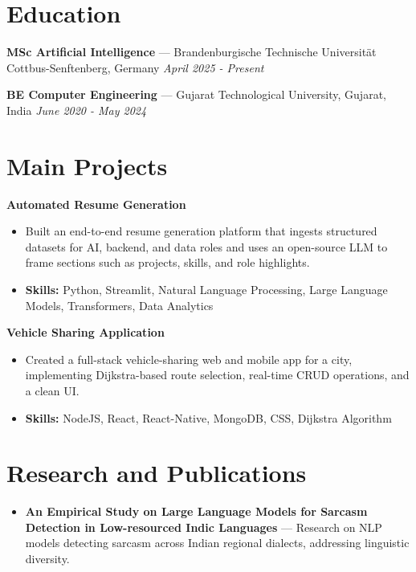 \documentclass[a4paper,10pt]{article}
\begin{document}
\section*{Education}
\textbf{MSc Artificial Intelligence} — Brandenburgische Technische Universität Cottbus-Senftenberg, Germany \hfill \textit{April 2025 - Present}\par
\vspace{1.5pt}
\textbf{BE Computer Engineering} — Gujarat Technological University, Gujarat, India \hfill \textit{June 2020 - May 2024}\par

\section*{Main Projects}
\textbf{Automated Resume Generation}\par
\vspace{1pt}
\begin{itemize}
  \item Built an end-to-end resume generation platform that ingests structured datasets for AI, backend, and data roles and uses an open-source LLM to frame sections such as projects, skills, and role highlights.
  \item \textbf{Skills:} Python, Streamlit, Natural Language Processing, Large Language Models, Transformers, Data Analytics
\end{itemize}
\vspace{3pt}
\textbf{Vehicle Sharing Application}\par
\vspace{1pt}
\begin{itemize}
  \item Created a full-stack vehicle-sharing web and mobile app for a city, implementing Dijkstra-based route selection, real-time CRUD operations, and a clean UI.
  \item \textbf{Skills:} NodeJS, React, React-Native, MongoDB, CSS, Dijkstra Algorithm
\end{itemize}

\section*{Research and Publications}
\begin{itemize}
\item \textbf{An Empirical Study on Large Language Models for Sarcasm Detection in Low-resourced Indic Languages} — Research on NLP models detecting sarcasm across Indian regional dialects, addressing linguistic diversity.
\end{itemize}
\end{document}
